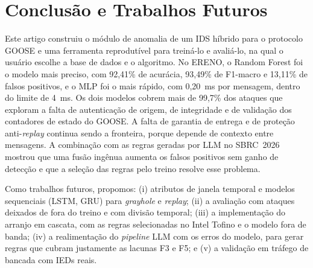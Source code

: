 \documentclass[12pt]{article}
\newcommand{\ataque}[1]{\textit{#1}}
\begin{document}
\section{Conclusão e Trabalhos Futuros}\label{sec:conc}

Este artigo construiu o módulo de anomalia de um IDS híbrido para o protocolo
GOOSE e uma ferramenta reprodutível para treiná-lo e avaliá-lo, na qual o
usuário escolhe a base de dados e o algoritmo. No ERENO, o Random Forest foi o
modelo mais preciso, com 92,41\% de acurácia, 93,49\% de F1-macro e 13,11\% de
falsos positivos, e o MLP foi o mais rápido, com 0,20~ms por mensagem, dentro do
limite de 4~ms. Os dois modelos cobrem mais de 99,7\% dos ataques que exploram a
falta de autenticação de origem, de integridade e de validação dos contadores
de estado do GOOSE. A falta de garantia de entrega e de proteção
anti-\textit{replay} continua sendo a fronteira, porque depende de contexto entre
mensagens. A combinação com as regras geradas por LLM no SBRC~2026 mostrou que
uma fusão ingênua aumenta os falsos positivos sem ganho de detecção e que a
seleção das regras pelo treino resolve esse problema.

Como trabalhos futuros, propomos: (i) atributos de janela temporal e modelos
sequenciais (LSTM, GRU) para \ataque{grayhole} e \textit{replay}; (ii) a
avaliação com ataques deixados de fora do treino e com divisão temporal; (iii) a
implementação do arranjo em cascata, com as regras selecionadas no Intel Tofino
e o modelo fora de banda; (iv) a realimentação do \textit{pipeline} LLM com os
erros do modelo, para gerar regras que cubram justamente as lacunas F3 e F5; e
(v) a validação em tráfego de bancada com IEDs reais.



\end{document}
